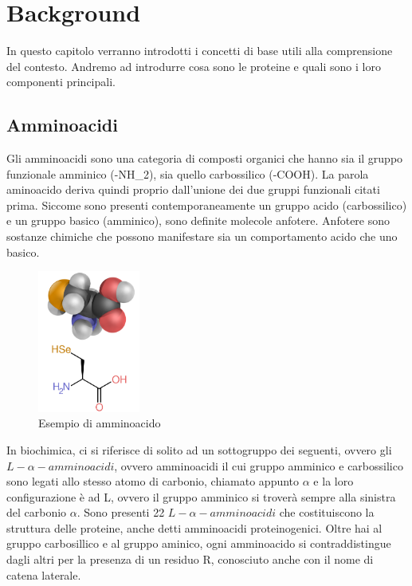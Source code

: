 \chapter{Background}\label{chapter:background}
In questo capitolo verranno introdotti i concetti di base utili alla comprensione del contesto. Andremo ad introdurre cosa sono 
le proteine e quali sono i loro componenti principali.

\section{Amminoacidi}\label{sec:cap_sec_subsec}
Gli amminoacidi sono una categoria di composti organici che hanno sia il gruppo funzionale amminico (-NH\_2), sia quello carbossilico (-COOH). La parola aminoacido 
deriva quindi proprio dall'unione dei due gruppi funzionali citati prima. Siccome sono presenti contemporaneamente un gruppo acido (carbossilico) e un gruppo basico (amminico), 
sono definite molecole anfotere. Anfotere sono sostanze chimiche che possono manifestare sia un comportamento acido che uno basico. 

\begin{figure}
    \centering
    \includegraphics[width=0.3\textwidth]{Immagini/800px-Selenocysteine_skeletal_3D.png}
    \caption{Esempio di amminoacido}
    \label{fig:Amminoacido}
\end{figure}

In biochimica, ci si riferisce di solito ad un sottogruppo dei seguenti, ovvero gli $L-\alpha-amminoacidi$, ovvero amminoacidi il cui gruppo amminico e carbossilico sono 
legati allo stesso atomo di carbonio, chiamato appunto $\alpha$ e la loro configurazione è ad L, ovvero il gruppo amminico si troverà sempre alla sinistra del carbonio $\alpha$.
Sono presenti 22 $L-\alpha-amminoacidi$ che costituiscono la struttura delle proteine, anche detti amminoacidi proteinogenici. 
Oltre hai al gruppo carbosillico e al gruppo aminico, ogni amminoacido si contraddistingue dagli altri per la presenza di un residuo R, conosciuto anche con il nome di 
catena laterale.

